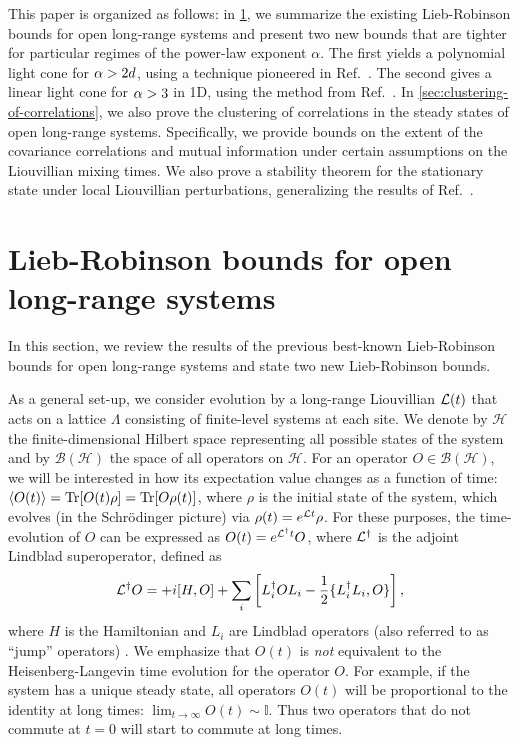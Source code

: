 This paper is organized as follows:  in \cref{sec:open-LR}, we summarize the existing Lieb-Robinson bounds for open long-range systems and present two new bounds that are tighter for particular regimes of the power-law exponent $\alpha$.
The first yields a polynomial light cone for $\alpha > 2d$, using a technique pioneered in Ref.~\cite{Tran2019a}.
The second gives a linear light cone for $\alpha > 3$ in 1D, using the method from Ref.~\cite{Chen2019}.
In \cref{sec:clustering-of-correlations}, we also prove the clustering of correlations in the steady states of open long-range systems.
Specifically, we provide bounds on the extent of the covariance correlations and mutual information under certain assumptions on the Liouvillian mixing times.
We also prove a stability theorem for the stationary state under local Liouvillian perturbations, generalizing the results of Ref.~\cite{Kastoryano2013}.

\section{Lieb-Robinson bounds for open long-range systems}
\label{sec:open-LR}
In this section, we review the results of the previous best-known Lieb-Robinson bounds for open long-range systems and state two new Lieb-Robinson bounds.

As a general set-up, we consider evolution by a long-range Liouvillian $\mathcal{L}(t)$ that acts on a lattice $\Lambda$ consisting of finite-level systems at each site.
We denote by $\mathcal{H}$ the finite-dimensional Hilbert space representing all possible states of the system and by $\mathcal {B(H)}$ the space of all operators on $\mathcal{H}$.
For an operator $O \in \mathcal {B(H)}$, we will be interested in how its expectation value changes as a function of time: $\langle O(t) \rangle = \text{Tr}[ O(t) \rho] = \text{Tr}[ O \rho(t)]$, where $\rho$ is the initial state of the system, which evolves (in the Schr\"odinger  picture) via $\rho(t) = e^{\mathcal{L} t} \rho$. For these purposes,
the time-evolution of $O$ can be expressed as $O(t) = e^{\mathcal{L}^\dag t} O$, where $\mathcal{L}^\dag$ is the adjoint Lindblad superoperator, defined as
\begin{align}
	\mathcal{L}^\dag O = +i[H,O] + \sum_i \left[L_i^\dag O L_i - \frac12 \{L_i^\dag L_i,O\}\right],
\end{align}
where $H$ is the Hamiltonian and $L_i$ are Lindblad operators (also referred to as ``jump'' operators) \cite{Breuer2010}.  We emphasize that $O(t)$ is \textit{not} equivalent to the Heisenberg-Langevin time evolution for the operator $O$. For example, if the system has a unique steady state, all operators $O(t)$ will be proportional to the identity at long times: $\lim_{t \rightarrow \infty} O(t) \sim \mathbb{I}$. Thus two operators that do not commute at $t=0$ will start to commute at long times.

